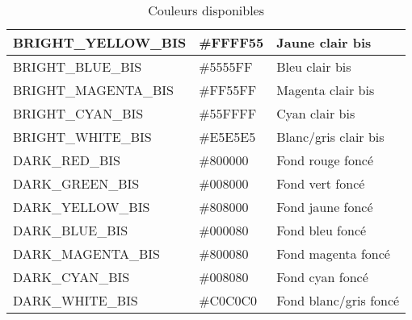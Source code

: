 \documentclass{article}
\begin{document}
\begin{table}[h!]
\begin{tabular}{|>{\centering\arraybackslash}m{4cm}|>{\centering\arraybackslash}m{3cm}|>{\centering\arraybackslash}m{3cm}|}
        \hline
        BRIGHT\_YELLOW\_BIS & \#FFFF55 & Jaune clair bis \\
        \hline
        BRIGHT\_BLUE\_BIS & \#5555FF & Bleu clair bis \\
        \hline
        BRIGHT\_MAGENTA\_BIS & \#FF55FF & Magenta clair bis \\
        \hline
        BRIGHT\_CYAN\_BIS & \#55FFFF & Cyan clair bis \\
        \hline
        BRIGHT\_WHITE\_BIS & \#E5E5E5 & Blanc/gris clair bis \\
        \hline
        DARK\_RED\_BIS & \#800000 & Fond rouge foncé \\
        \hline
        DARK\_GREEN\_BIS & \#008000 & Fond vert foncé \\
        \hline
        DARK\_YELLOW\_BIS & \#808000 & Fond jaune foncé \\
        \hline
        DARK\_BLUE\_BIS & \#000080 & Fond bleu foncé \\
        \hline
        DARK\_MAGENTA\_BIS & \#800080 & Fond magenta foncé \\
        \hline
        DARK\_CYAN\_BIS & \#008080 & Fond cyan foncé \\
        \hline
        DARK\_WHITE\_BIS & \#C0C0C0 & Fond blanc/gris foncé \\
        \hline
    \end{tabular}
    \label{tab:couleur}
    \caption{Couleurs disponibles}
\end{table}

\newpage
\end{document}
